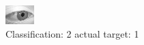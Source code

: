 \begin{figure}[h!]
\begin{center}
\includegraphics[width=0.60\columnwidth]{figures/ID2752_class_2_target_1.png}
\end{center}
\caption{ Classification: 2 actual target: 1}
\label{fig:ID2752_class_2_target_1}
\end{figure}
